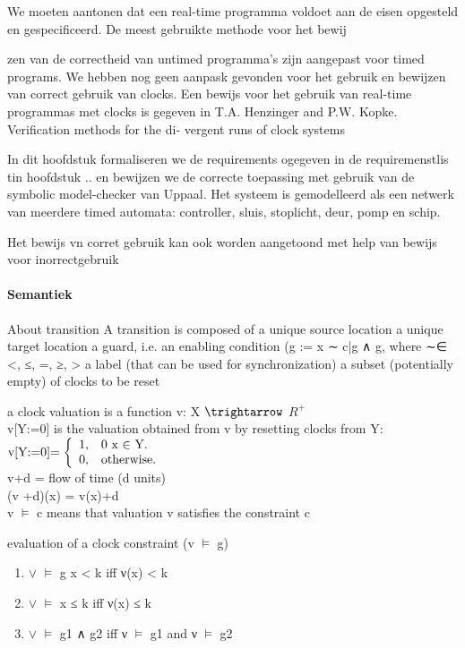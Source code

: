  We moeten aantonen dat een real-time programma voldoet aan de eisen opgesteld en gespecificeerd. De meest gebruikte methode voor het bewij
 
 zen van de correctheid van untimed programma's zijn aangepast voor timed programs.  We hebben nog geen aanpask gevonden voor het gebruik en bewijzen van correct gebruik van clocks.  Een bewijs voor het gebruik van real-time programmas met clocks is gegeven in T.A. Henzinger and P.W. Kopke. Verification methods for the di-
 vergent runs of clock systems
 
 In dit hoofdstuk formaliseren we de requirements ogegeven in de requiremenstlis tin hoofdstuk .. en bewijzen we de correcte toepassing met gebruik van de symbolic model-checker van Uppaal.
 Het systeem is gemodelleerd als een netwerk van meerdere timed automata: controller, sluis, stoplicht, deur, pomp en schip.
 
 Het bewijs vn corret gebruik kan ook worden aangetoond met help van bewijs voor inorrectgebruik
 
 
 
\paragraph{Semantiek}


About transition
A transition is composed of
a unique source location
a unique target location
a guard, i.e. an enabling condition (g := x ∼ c|g ∧ g, where
∼∈ {<, ≤, =, ≥, >}
a label (that can be used for synchronization)
a subset (potentially empty) of clocks to be reset

a clock valuation is a function v: X $\trightarrow$ $R^+$ \\
v[Y:=0] is the valuation obtained from v by resetting clocks from Y:  \\

\begin{math}
	$v[Y:=0]$=\left\{
	\begin{array}{ll}
		1, & \mbox{0 x $\in$ Y}.\\
		0, & \mbox{otherwise}.
	\end{array}
	\right.
\end{math}
\\

v+d = flow of time (d units) \\
(v +d)(x) = v(x)+d  \\
v $\models$ c means that valuation v satisfies the constraint c

evaluation of a clock constraint (v $\models$ g) \\
\begin{enumerate}
	\item $\vee$ $\models$ g x  < k iff ν(x) < k
	\item $\vee$ $\models$ x ≤ k iff ν(x) ≤ k
	\item $\vee$ $\models$ g1 ∧ g2 iff ν $\models$ g1 and ν $\models$ g2
\end{enumerate} 
\\
\\
\\

